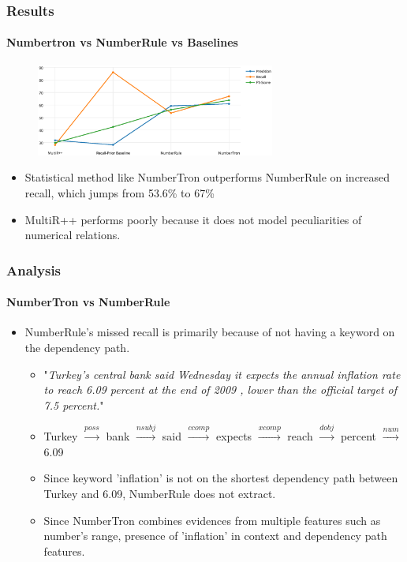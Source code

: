 \documentclass{beamer}
\begin{document}
\begin{frame}
\frametitle{Results}
\framesubtitle{Numbertron vs NumberRule vs Baselines}

\begin{figure}
\includegraphics[width=0.7\textwidth]{images/main_comparison.eps}
\end{figure}

\begin{itemize}
\item Statistical method like NumberTron outperforms NumberRule on increased recall, which jumps from 53.6\% to 67\%
\item MultiR++ performs poorly because it does not model peculiarities of numerical relations.
\end{itemize}
\end{frame}
\begin{frame}
\frametitle{Analysis}
\framesubtitle{NumberTron vs NumberRule}

\begin{itemize}
	\item NumberRule's missed recall is primarily because of not having a keyword on the dependency path.
    \begin{itemize}
    \setlength\itemsep{1em}
    	\item "{\em Turkey's central bank said Wednesday it expects the annual inflation rate to reach 6.09 percent at the end of 2009 , lower than the official target of 7.5 percent.}"
        \item Turkey $\xrightarrow{poss}$ bank $\xrightarrow{nsubj}$ said $\xrightarrow{ccomp}$ expects $\xrightarrow{xcomp}$ reach $\xrightarrow{dobj}$ percent $\xrightarrow{num}$ 6.09
        \item Since keyword 'inflation' is not on the shortest dependency path between Turkey and 6.09, NumberRule does not extract.
        \item Since NumberTron combines evidences from multiple features such as number's range, presence of 'inflation' in context and dependency path features.
    \end{itemize}
\end{itemize}


\end{frame}
\end{document}
